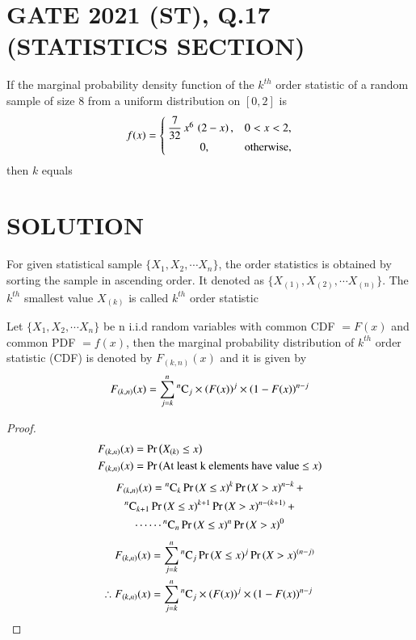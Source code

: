 \documentclass[journal,12pt,twocolumn]{IEEEtran}
\begin{document}
\section{GATE 2021 (ST), Q.17 (STATISTICS SECTION)} 
If the marginal probability density function of the $k^{th}$ order statistic of a 
random sample of size 8 from a uniform distribution on $[0,2]$ is
\[
  f(x) =
  \begin{cases}
   \dfrac{7}{32}\,x^{6}\,\left(2-x\right),  & 0<x<2, \\ 
      \hspace{1cm}   0,               & \text{otherwise,} 
  \end{cases}
\]
then $k$ equals \underline{\hspace{3cm}}
\bigskip
\section{SOLUTION}
\begin{definition}
For given statistical sample $\{X_1, X_2,\cdots X_n\}$, the order statistics is obtained by sorting the
sample in ascending order. It denoted as $\{X_{(1)}, X_{(2)},\cdots X_{(n)}\}$. The $k^{th}$ smallest value
$X_{(k)}$ is called  $k^{th}$ order statistic 
\end{definition}
\begin{theorem}
Let $\{X_1, X_2, \cdots X_n\}$ be n i.i.d random variables with common CDF $= F(x)$ and common PDF $= f(x)$, 
then the marginal probability distribution of $k^{th}$ order statistic (CDF) is denoted by $F_{(k,n)}(x)$ 
and it is given by
\begin{align}
F_{(k,n)}(x) =  \sum_{j=k}^{n}{}^{n}\mathrm{C}_{j}\times \left(F(x)\right)^{j}\times\left(1-F(x)\right)^{n-j} \label{eqn_1}
\end{align}
\label{th1}
\end{theorem}
\begin{proof}
\begin{align}
F_{(k,n)}(x) &= \Pr\left(X_{(k)}\leq x\right) \\
\nonumber F_{(k,n)}(x) &= \Pr\left(\text{At least k elements have value $\leq x$}\right)
\end{align}
\begin{multline}
F_{(k,n)}(x) ={}^{n}\mathrm{C}_{k}\Pr\left(X\leq x\right)^{k}\Pr\left(X>x\right)^{n-k} + \\
{}^{n}\mathrm{C}_{k+1}\Pr\left(X\leq x\right)^{k+1}\Pr\left(X>x\right)^{n-(k+1)} +  \\
\cdots \cdots {}^{n}\mathrm{C}_{n}\Pr\left(X\leq x\right)^{n}\Pr\left(X>x\right)^{0}
\end{multline}
\begin{align}
F_{(k,n)}(x) &=\sum_{j=k}^{n}{}^{n}\mathrm{C}_{j} \Pr\left(X\leq x\right)^{j}\Pr\left(X>x\right)^{(n-j)} \\
\therefore F_{(k,n)}(x) &=  \sum_{j=k}^{n}{}^{n}\mathrm{C}_{j}\times \left(F(x)\right)^{j}\times\left(1-F(x)\right)^{n-j} 
\end{align}
\end{proof}
\end{document}
